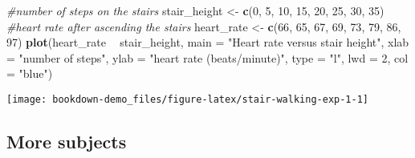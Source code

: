 \documentclass[]{book}
\newenvironment{Shaded}{\begin{snugshade}}{\end{snugshade}}
\newcommand{\CommentTok}[1]{\textcolor[rgb]{0.56,0.35,0.01}{\textit{#1}}}
\newcommand{\DataTypeTok}[1]{\textcolor[rgb]{0.13,0.29,0.53}{#1}}
\newcommand{\DecValTok}[1]{\textcolor[rgb]{0.00,0.00,0.81}{#1}}
\newcommand{\KeywordTok}[1]{\textcolor[rgb]{0.13,0.29,0.53}{\textbf{#1}}}
\newcommand{\NormalTok}[1]{#1}
\newcommand{\OperatorTok}[1]{\textcolor[rgb]{0.81,0.36,0.00}{\textbf{#1}}}
\newcommand{\StringTok}[1]{\textcolor[rgb]{0.31,0.60,0.02}{#1}}
\begin{document}
\begin{Shaded}
\begin{Highlighting}[]
\CommentTok{#number of steps on the stairs}
\NormalTok{stair_height <-}\StringTok{ }\KeywordTok{c}\NormalTok{(}\DecValTok{0}\NormalTok{, }\DecValTok{5}\NormalTok{, }\DecValTok{10}\NormalTok{, }\DecValTok{15}\NormalTok{, }\DecValTok{20}\NormalTok{, }\DecValTok{25}\NormalTok{, }\DecValTok{30}\NormalTok{, }\DecValTok{35}\NormalTok{)}
\CommentTok{#heart rate after ascending the stairs}
\NormalTok{heart_rate <-}\StringTok{ }\KeywordTok{c}\NormalTok{(}\DecValTok{66}\NormalTok{, }\DecValTok{65}\NormalTok{, }\DecValTok{67}\NormalTok{, }\DecValTok{69}\NormalTok{, }\DecValTok{73}\NormalTok{, }\DecValTok{79}\NormalTok{, }\DecValTok{86}\NormalTok{, }\DecValTok{97}\NormalTok{)}
\KeywordTok{plot}\NormalTok{(heart_rate }\OperatorTok{~}\StringTok{ }\NormalTok{stair_height,}
      \DataTypeTok{main =} \StringTok{"Heart rate versus stair height"}\NormalTok{,}
      \DataTypeTok{xlab =} \StringTok{"number of steps"}\NormalTok{,}
      \DataTypeTok{ylab =} \StringTok{"heart rate (beats/minute)"}\NormalTok{,}
      \DataTypeTok{type =} \StringTok{"l"}\NormalTok{,}
      \DataTypeTok{lwd =} \DecValTok{2}\NormalTok{,}
      \DataTypeTok{col =} \StringTok{"blue"}\NormalTok{)}
\end{Highlighting}
\end{Shaded}

\begin{center}\texttt{[image: bookdown-demo\_files/figure-latex/stair-walking-exp-1-1]} \end{center}

\hypertarget{more-subjects-1}{%
\subsection{More subjects}\label{more-subjects-1}}
\end{document}
